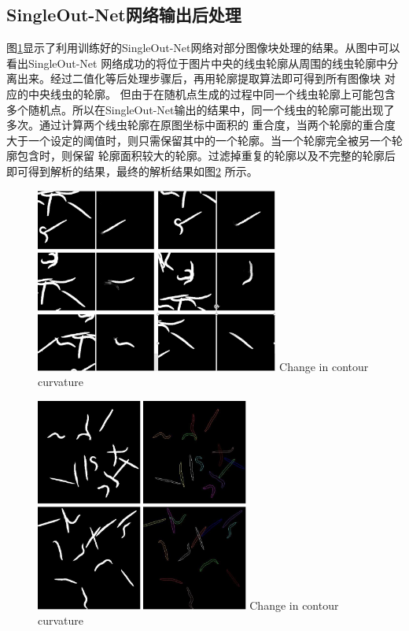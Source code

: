 \subsection{SingleOut-Net网络输出后处理}
	图\ref{fig:chap4:singleout}显示了利用训练好的SingleOut-Net网络对部分图像块处理的结果。从图中可以看出SingleOut-Net
	网络成功的将位于图片中央的线虫轮廓从周围的线虫轮廓中分离出来。经过二值化等后处理步骤后，再用轮廓提取算法即可得到所有图像块
	对应的中央线虫的轮廓。
	但由于在随机点生成的过程中同一个线虫轮廓上可能包含
	多个随机点。所以在SingleOut-Net输出的结果中，同一个线虫的轮廓可能出现了多次。通过计算两个线虫轮廓在原图坐标中面积的
	重合度，当两个轮廓的重合度大于一个设定的阈值时，则只需保留其中的一个轮廓。当一个轮廓完全被另一个轮廓包含时，则保留
	轮廓面积较大的轮廓。过滤掉重复的轮廓以及不完整的轮廓后即可得到解析的结果，最终的解析结果如图\ref{fig:chap4:parser}
	所示。
	\begin{figure}[htb]
	  \centering
	  \includegraphics[width=8cm]{figure/chap4/singleout.jpg}
		{Change in contour curvature}
	  \label{fig:chap4:singleout}
	\end{figure}
	\begin{figure}[htb]
	  \centering
	  \includegraphics[width=7cm]{figure/chap4/Parser_Worms5.jpg}
		{Change in contour curvature}
	  \label{fig:chap4:parser}
	\end{figure}
